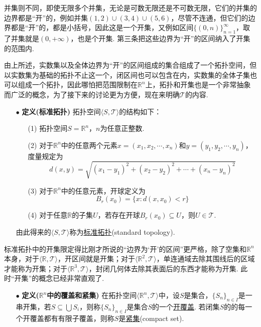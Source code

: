 \documentclass[UTF8]{ctexart}
\begin{document}
并集则不同，即使无限多个并集，无论是可数无限还是不可数无限，它们的并集的边界都是“开”的，例如并集\((1,2)\cup(3,4)\cup(5,6)\)，尽管不连通，但它们的边界都是“开”的，都是小括号，因此这是一个开集，又例如区间\(\{(0,n)\}_{n=1}^{\infty}\)，取了并集就是\((0,+\infty)\)，也是个开集. 第三条把这些边界为“开”的区间纳入了开集的范围内.

由上所述，实数集以及全体边界为“开”的区间组成的集合组成了一个拓扑空间，但以实数集为基础的拓扑不止这一个，闭区间也可以包含在内，实数集的全体子集也可以组成一个拓扑，因此哪怕把范围限制在\(\mathbb{R}^n\)上，拓扑和开集也是一个非常抽象而广泛的概念，为了接下来的讨论更为方便，现在来明确\(\mathcal{T}\)的内容.

\begin{itemize}
    \item [\(\bullet\)] \textbf{定义(标准拓扑)}
    \newline
    拓扑空间\(\langle S, \mathcal{T} \rangle\)的结构如下：
    \begin{itemize}
        \item[(1)] 拓扑空间\(S=\mathbb{R}^n\)，\(n\)为任意正整数.
        \item[(2)] 对于\(\mathbb{R}^n\)中的任意两个元素\(x=(x_1, x_2, \cdots, x_n)\)和\(y=(y_1,y_2,\cdots,y_n)\)，度量规定为
        \[d(x,y)=\sqrt{(x_1-y_1)^2+(x_2-y_2)^2+\cdots+(x_n-y_n)^2}\]
        \item[(3)] 对于\(\mathbb{R}^n\)中的任意元素，开球定义为
        \[B_r(x_0) = \{x: d(x,x_0) < r\}\]
        \item[(4)] 对于任意\(\mathbb{R}\)的子集\(U\)，若存在开球\(B_r(x_0) \subseteq U\)，则\(U \in \mathcal{T}\).
    \end{itemize}
    由此得来的\(\langle S, \mathcal{T} \rangle\)称为\uline{标准拓扑}(standard topology).
\end{itemize}

标准拓扑中的开集限定得比刚才所说的“边界为‘开’的区间”更严格，除了空集和\(\mathbb{R}^n\)本身，对于\(\langle \mathbb{R}, \mathcal{T} \rangle\)，开区间就是开集；对于\(\langle \mathbb{R}^2, \mathcal{T} \rangle\)，单连通域去除其围线后的区域才能称为开集；对于\(\langle \mathbb{R}^3, \mathcal{T} \rangle\)，封闭几何体去除其表面后的东西才能称为开集. 此时“开集”的概念已经非常直观了.

\begin{itemize}
    \item [\(\bullet\)] \textbf{定义(\(\mathbb{R}^n\)中的覆盖和紧集)}
    \newline
    在拓扑空间\(\langle \mathbb{R}^n,\mathcal{T} \rangle \)中，设\(S\)是集合，\(\{S_n\}_{n \in I}\)是一串开集，若\(S \subseteq \bigcup S_i\)，则称\(\{S_n\}_{n \in I}\)是集合\(S\)的一个\uline{开覆盖}.
    \newline
    若闭集\(S\)的的每一个开覆盖都有有限子覆盖，则称\(S\)是\uline{紧集}(compact set).
\end{itemize}
\end{document}
